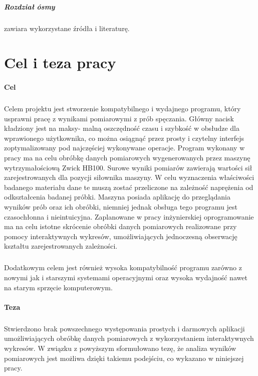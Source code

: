 \documentclass[12pt]{report}
\begin{document}
	\paragraph{Rozdział ósmy} zawiara wykorzystane źródła i literaturę.
	
	
	\chapter{Cel i teza pracy}
	\subsubsection{Cel}
	\paragraph{}
	Celem projektu jest stworzenie kompatybilnego i wydajnego programu, który usprawni
	pracę z wynikami pomiarowymi z prób spęczania. Główny nacisk kładziony jest na maksy-
	malną oszczędność czasu i szybkość w obsłudze dla wprawionego użytkownika, co można
	osiągnąć przez prosty i czytelny interfejs zoptymalizowany pod najczęściej wykonywane
	operacje. Program wykonany w pracy ma na celu obróbkę danych pomiarowych wygenerowanych przez maszynę wytrzymałościową Zwick HB100. Surowe wyniki pomiarów zawierają wartości sił zarejestrowanych dla pozycji siłownika maszyny. W celu wyznaczenia właściwości badanego materiału dane te muszą zostać przeliczone na zależność naprężenia od odkształcenia badanej próbki. Maszyna posiada aplikację do przeglądania wyników prób oraz ich obróbki, niemniej jednak obsługa tego programu jest czasochłonna i nieintuicyjna. Zaplanowane w pracy inżynierskiej oprogramowanie ma na celu istotne skrócenie obróbki danych pomiarowych realizowane przy pomocy interaktywnych wykresów, umożliwiających jednoczesną obserwację kształtu zarejestrowanych zależności.
	
	\paragraph{}
	Dodatkowym celem jest również wysoka kompatybilność programu zarówno z nowymi
	jak i starszymi systemami operacyjnymi oraz wysoka wydajność nawet na starym sprzęcie
	komputerowym.
	
	\subsubsection{Teza}
	\paragraph{}
	Stwierdzono brak powszechnego występowania prostych i darmowych aplikacji umożliwiających obróbkę danych pomiarowych z wykorzystaniem interaktywnych wykresów. W związku z powyższym sformułowano tezę, że analiza wyników pomiarowych jest możliwa dzięki takiemu podejściu, co wykazano w niniejszej pracy.
	
\end{document}
